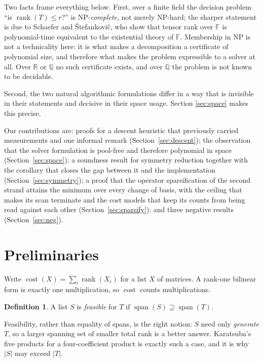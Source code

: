 \documentclass[11pt,reqno]{amsart}
\theoremstyle{plain}
\theoremstyle{definition}
\newtheorem{definition}[theorem]{Definition}
\theoremstyle{remark}
\newcommand{\GF}{\mathbb{F}}
\newcommand{\rk}{\operatorname{rank}}
\newcommand{\spn}{\operatorname{span}}
\newcommand{\cost}{\operatorname{cost}}
\begin{document}
Two facts frame everything below. First, over a finite field the decision
problem ``is $\rk(T)\le r$?'' is NP-\emph{complete}, not merely NP-hard; the
sharper statement is due to Schaefer and \v{S}tefankovi\v{c}, who show that
tensor rank over $\GF$ is polynomial-time equivalent to the existential theory
of $\GF$. Membership in NP is not a technicality here: it is what makes a
decomposition a certificate of polynomial size, and therefore what makes the
problem expressible to a solver at all. Over $\mathbb{R}$ or $\mathbb{Q}$ no such
certificate exists, and over $\mathbb{Q}$ the problem is not known to be
decidable.

Second, the two natural algorithmic formulations differ in a way that is
invisible in their statements and decisive in their space usage. Section
\ref{sec:space} makes this precise.

Our contributions are: proofs for a descent heuristic that previously carried
measurements and one informal remark (Section~\ref{sec:descent}); the observation
that the solver formulation is pool-free and therefore polynomial in space
(Section~\ref{sec:space}); a soundness result for symmetry reduction together
with the corollary that closes the gap between it and the implementation
(Section~\ref{sec:symmetry}); a proof that the operator sparsification of the
second strand attains the minimum over every change of basis, with the ceiling
that makes its scan terminate and the cost models that keep its counts from
being read against each other (Section~\ref{sec:sparsify}); and three negative
results (Section~\ref{sec:neg}).

\section{Preliminaries}

Write $\cost(X)=\sum_i \rk(X_i)$ for a list $X$ of matrices. A rank-one
bilinear form is exactly one multiplication, so $\cost$ counts multiplications.

\begin{definition}
A list $S$ is \emph{feasible} for $T$ if $\spn(S)\supseteq\spn(T)$.
\end{definition}

Feasibility, rather than equality of spans, is the right notion: $S$ need only
\emph{generate} $T$, so a larger spanning set of smaller total rank is a better
answer. Karatsuba's five products for a four-coefficient product is exactly such
a case, and it is why $|S|$ may exceed $|T|$.
\end{document}
